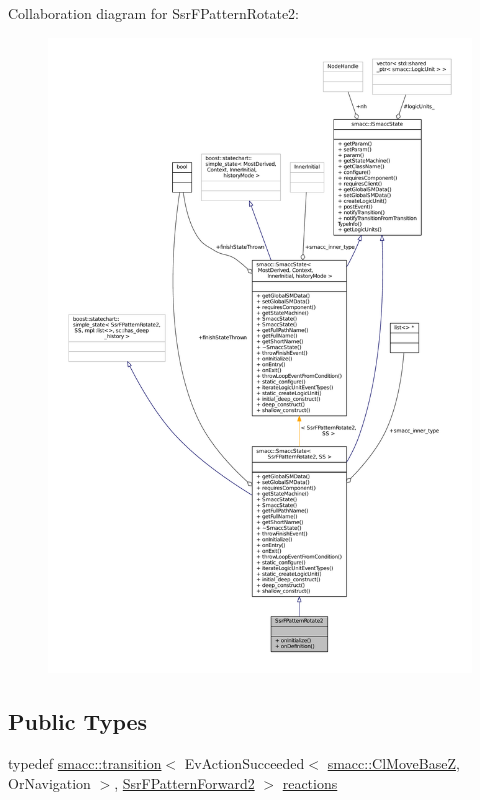 Collaboration diagram for Ssr\+F\+Pattern\+Rotate2\+:
\nopagebreak
\begin{figure}[H]
\begin{center}
\leavevmode
\includegraphics[width=350pt]{structSsrFPatternRotate2__coll__graph}
\end{center}
\end{figure}
\subsection*{Public Types}
\begin{DoxyCompactItemize}
\item 
typedef \hyperlink{classsmacc_1_1transition}{smacc\+::transition}$<$ Ev\+Action\+Succeeded$<$ \hyperlink{classsmacc_1_1ClMoveBaseZ}{smacc\+::\+Cl\+Move\+BaseZ}, Or\+Navigation $>$, \hyperlink{structSsrFPatternForward2}{Ssr\+F\+Pattern\+Forward2} $>$ \hyperlink{structSsrFPatternRotate2_a7415aa59cf273cef36f62fe1a796bb48}{reactions}
\end{DoxyCompactItemize}
